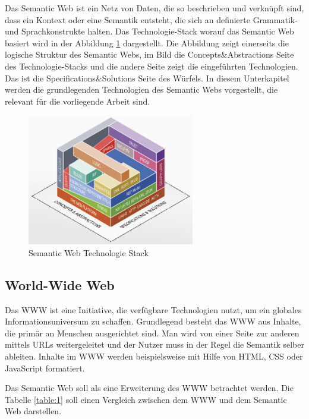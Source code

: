 Das Semantic Web ist ein Netz von Daten, die so beschrieben und verknüpft sind, dass ein Kontext oder eine Semantik entsteht, die sich an definierte Grammatik- und Sprachkonstrukte halten. \citep[vgl.]{hebeler_semantic_2009}
Das Technologie-Stack worauf das Semantic Web basiert wird in der Abbildung \ref{fig:abb1} dargestellt.
Die Abbildung zeigt einerseits die logische Struktur des Semantic Webs, im Bild die Concepts\&Abstractions Seite des Technologie-Stacks und die andere Seite zeigt die eingeführten Technologien.
Das ist die Specifications\&Solutions Seite des Würfels.
In diesem Unterkapitel werden die grundlegenden Technologien des Semantic Webs vorgestellt, die relevant für die vorliegende Arbeit sind.

\begin{figure}[h]
	\centering
    	\includegraphics[width=0.65\textwidth]{Images/Linked_Data_Tech_Stack}
   	\caption{Semantic Web Technologie Stack}
   	\label{fig:abb1}
\end{figure}

\subsection{World-Wide Web}

Das \ac{WWW} ist eine Initiative, die verfügbare Technologien nutzt, um ein globales Informationsuniversum zu schaffen.
Grundlegend besteht das \ac{WWW} aus Inhalte, die primär an Menschen ausgerichtet sind.
Man wird von einer Seite zur anderen mittels \ac{URL}s weitergeleitet und der Nutzer muss in der Regel die Semantik selber ableiten.
Inhalte im \ac{WWW} werden beispielsweise mit Hilfe von HTML, CSS oder JavaScript formatiert.

Das Semantic Web soll als eine Erweiterung des WWW betrachtet werden.
Die Tabelle \ref{table:1} soll einen Vergleich zwischen dem \ac{WWW} und dem Semantic Web darstellen.

